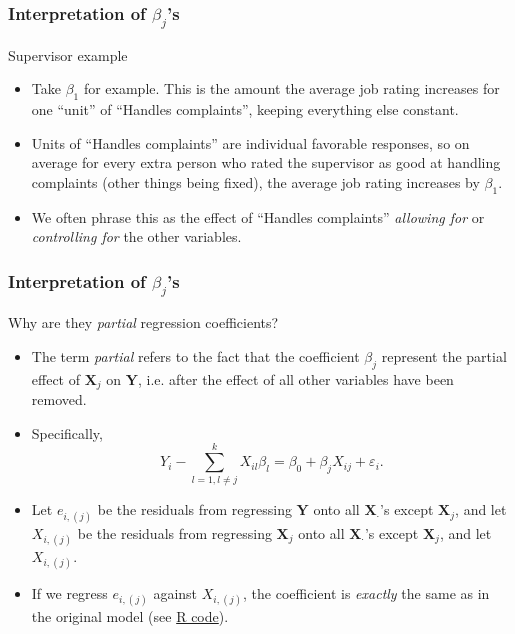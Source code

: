 \documentclass[handout]{beamer}
\begin{document}
   \begin{frame} \frametitle{Interpretation of $\beta_j$'s}

   \begin{block}
   {Supervisor example}
   \begin{itemize}

   \item Take $\beta_1$ for example. This is the amount the average
   job rating increases for one ``unit'' of ``Handles complaints'',
   keeping everything else constant.

   \item Units of ``Handles complaints'' are individual favorable responses, so on average
   for every extra person who rated the supervisor as good at handling complaints
   (other things being fixed), the average job rating increases by $\beta_1$.

   \item We often phrase this as the effect of ``Handles complaints'' {\em
   allowing for} or {\em controlling for} the other variables.
   \end{itemize}
   \end{block}
   \end{frame}


   \begin{frame} \frametitle{Interpretation of $\beta_j$'s}

   \begin{block}
   {Why are they {\em partial} regression coefficients?}
   \begin{itemize}

   \item The term {\em partial} refers to the fact that the coefficient $\beta_j$
   represent the partial effect of $\pmb{X}_j$ on $\pmb{Y}$, i.e. after the effect of all other variables have been removed.

   \item Specifically,
   $$
   Y_i - \sum_{l=1, l \neq j}^k X_{il} \beta_l = \beta_0 + \beta_j X_{ij} + \varepsilon_i.$$


   \item Let $e_{i,(j)}$ be the residuals from regressing $\pmb{Y}$ onto all $\pmb{X}_{\cdot}$'s except $\pmb{X}_j$, and let $X_{i,(j)}$ be the residuals from
   regressing $\pmb{X}_j$ onto all $\pmb{X}_{\cdot}$'s except $\pmb{X}_j$, and let $X_{i,(j)}$.

   \item If we regress $e_{i,(j)}$ against $X_{i,(j)}$, the coefficient
   is {\em exactly} the same as in the original model (see \href{http://stats191.stanford.edu/multiple.html}{R code}).

   \end{itemize}
   \end{block}
   \end{frame}
\end{document}
